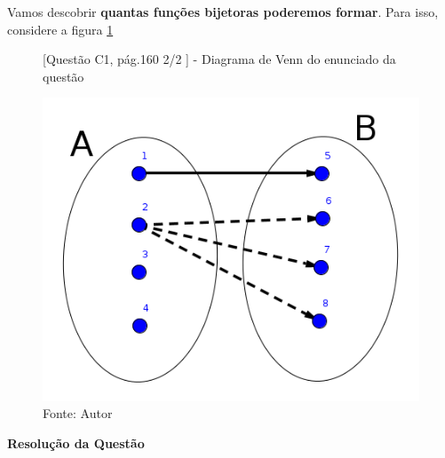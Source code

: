 \documentclass[a4paper,12pt]{article}
\begin{document}
\begin{enumerate}
Vamos descobrir \textbf{quantas funções bijetoras poderemos formar}. Para isso, considere a figura \ref{cap21-exercicios-C1-pag160-2}

   \begin{figure}[!htb]
      \centering
      \caption{[Questão C1, pág.160 2/2 ] - Diagrama de Venn do enunciado da questão}
      \includegraphics[scale=0.3]{../../imagens/cap21-exercicios-C1-pag160-2.png}
      \caption*{Fonte: Autor}
      \label{cap21-exercicios-C1-pag160-2}
    \end{figure}

\newpage    
    
\begin{center}
{\large \textbf{Resolução da Questão}}
\end{center}    
   

\end{enumerate}
\end{document}
